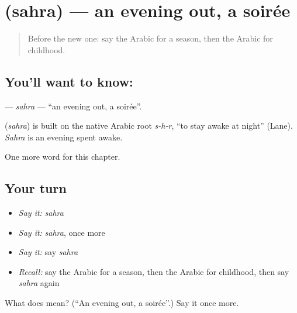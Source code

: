 \section[\texorpdfstring{\ar{سهرة} (sahra)}{سهرة (sahra)}]{ (sahra) — an evening out, a soirée}

\label{lesson:AR-C264-sahra}



\begin{quote}
Before the new one: say the Arabic for a season, then the Arabic for childhood.
\end{quote}

\subsection*{You'll want to know: }
\textbf{} — \emph{sahra} — \textquotedblleft{}an evening out, a soirée\textquotedblright{}.

\begin{cousinweb}
\textbf{} (\emph{sahra}) is built on the native Arabic root \emph{s-h-r}, \textquotedblleft{}to stay awake at night\textquotedblright{} (Lane). \emph{Sahra} is an evening spent awake.
\end{cousinweb}

\begin{grammarlens}[title={What you've built}]
One more word for this chapter.
\end{grammarlens}

\subsection*{Your turn}
\begin{itemize}
\raggedright
  \item \emph{Say it:} \emph{sahra}
  \item \emph{Say it:} \emph{sahra}, once more
  \item \emph{Say it:} say \emph{sahra}
  \item \emph{Recall:} say the Arabic for a season, then the Arabic for childhood, then say \emph{sahra} again
\end{itemize}

\begin{tcolorbox}[breakable,colback=teal!4,colframe=teal!35!black,title={Before you move on}]
What does  mean? (\textquotedblleft{}An evening out, a soirée\textquotedblright{}.) Say it once more.
\end{tcolorbox}
